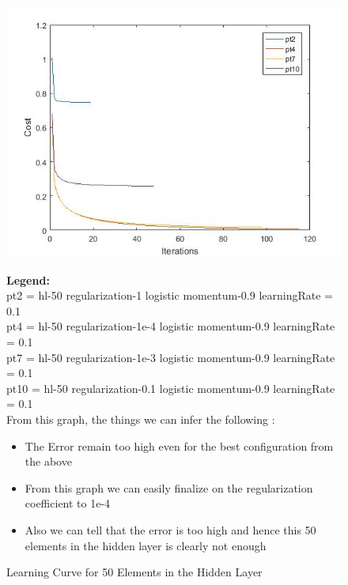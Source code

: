 \documentclass[conference]{IEEEtran}
\begin{document}
\begin{figure}[h!]
\includegraphics[scale=0.42]{hl50(1).jpg}
\caption{Learning Curve for 50 Elements in the Hidden Layer}
\footnotesize{
\textbf{Legend:} \\
pt2 = hl-50 regularization-1 logistic momentum-0.9 learningRate = 0.1\\
pt4 = hl-50 regularization-1e-4 logistic momentum-0.9 learningRate = 0.1\\
pt7 = hl-50 regularization-1e-3 logistic momentum-0.9 learningRate = 0.1\\
pt10 = hl-50 regularization-0.1 logistic momentum-0.9 learningRate = 0.1\\

From this graph, the things we can infer the following :
\begin{itemize} 
\item The Error remain too high even for the best configuration from the above
\item From this graph we can easily finalize on the regularization coefficient to 1e-4
\item Also we can tell that the error is too high and hence this 50 elements in the hidden layer is clearly not enough
\end{itemize}}
\label{50HL}
\end{figure}
\end{document}
